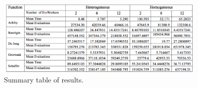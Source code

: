 \documentclass{llncs}
\begin{document}
\begin{figure}[t]
    \centering
        \includegraphics[width=10cm]{img/table.png}
    \caption{Summary table of results. }
    \label{fig:summary}
\end{figure}
\end{document}
